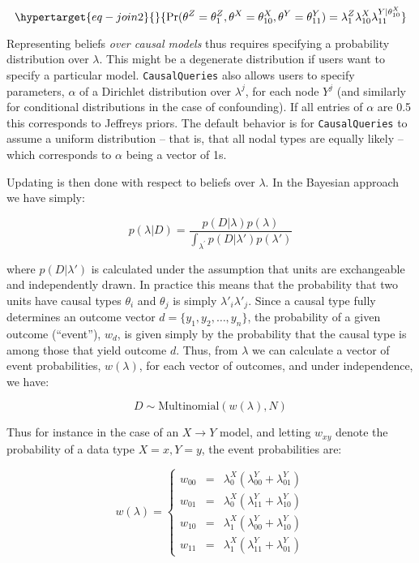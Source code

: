 \documentclass[
  11pt,
  article]{jss}
\begin{document}
\begin{equation}\protect\hypertarget{eq-join2}{}{
\Pr(\theta^Z = \theta^Z_1, \theta^X = \theta^X_{10}, \theta^Y = \theta^Y_{11}) = 
\lambda^Z_1\lambda^X_{10}\lambda^{Y|\theta^X_{10}}_{11}
}\label{eq-join2}\end{equation}

Representing beliefs \emph{over causal models} thus requires specifying
a probability distribution over \(\lambda\). This might be a degenerate
distribution if users want to specify a particular model.
\texttt{CausalQueries} also allows users to specify parameters,
\(\alpha\) of a Dirichlet distribution over \(\lambda^j\), for each node
\(Y^j\) (and similarly for conditional distributions in the case of
confounding). If all entries of \(\alpha\) are 0.5 this corresponds to
Jeffreys priors. The default behavior is for \texttt{CausalQueries} to
assume a uniform distribution -- that is, that all nodal types are
equally likely -- which corresponds to \(\alpha\) being a vector of 1s.

Updating is then done with respect to beliefs over \(\lambda\). In the
Bayesian approach we have simply:

\[p(\lambda|D) = \frac{p(D|\lambda)p(\lambda)}{\int_{\lambda^{'}} p(D|\lambda')p(\lambda')}\]

where \(p(D|\lambda')\) is calculated under the assumption that units
are exchangeable and independently drawn. In practice this means that
the probability that two units have causal types \(\theta_i\) and
\(\theta_j\) is simply \(\lambda'_i\lambda'_j\). Since a causal type
fully determines an outcome vector \(d = \{y_1, y_2,\dots,y_n\}\), the
probability of a given outcome (``event''), \(w_d\), is given simply by
the probability that the causal type is among those that yield outcome
\(d\). Thus, from \(\lambda\) we can calculate a vector of event
probabilities, \(w(\lambda)\), for each vector of outcomes, and under
independence, we have:

\[D \sim \text{Multinomial}(w(\lambda), N)\]

Thus for instance in the case of an \(X \rightarrow Y\) model, and
letting \(w_{xy}\) denote the probability of a data type \(X=x, Y=y\),
the event probabilities are:

\[w(\lambda) = \left\{\begin{array}{ccc} w_{00} & = & \lambda^X_0(\lambda^Y_{00} + \lambda^Y_{01})\\ 
w_{01} & = & \lambda^X_0(\lambda^Y_{11} + \lambda^Y_{10})\\
w_{10} & = & \lambda^X_1(\lambda^Y_{00} + \lambda^Y_{10})\\
w_{11} & = & \lambda^X_1(\lambda^Y_{11} + \lambda^Y_{01})\end{array} \right.\]
\end{document}
